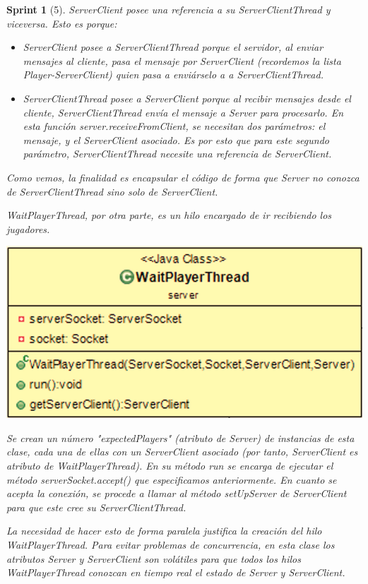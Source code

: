 \documentclass[12pt,a4paper,openright]{book}
\theoremstyle{break}
\newtheorem*{sprint}{Sprint}
\begin{document}
\begin{sprint}[5]
ServerClient posee una referencia a su ServerClientThread y viceversa. Esto es porque:

\begin{itemize}
\item ServerClient posee a ServerClientThread porque el servidor, al enviar mensajes al cliente, pasa el mensaje por ServerClient (recordemos la lista Player-ServerClient) quien pasa a enviárselo a a ServerClientThread.
\item ServerClientThread posee a ServerClient porque al recibir mensajes desde el cliente, ServerClientThread envía el mensaje a Server para procesarlo. En esta función server.receiveFromClient, se necesitan dos parámetros: el mensaje, y el ServerClient asociado. Es por esto que para este segundo parámetro, ServerClientThread necesite una referencia de ServerClient.
\end{itemize}

Como vemos, la finalidad es encapsular el código de forma que Server no conozca de ServerClientThread sino solo de ServerClient.

WaitPlayerThread, por otra parte, es un hilo encargado de ir recibiendo los jugadores.

\begin{center}
\includegraphics[scale=0.3]{WaitPlayerThread-sprint5.png} 
\end{center}

Se crean un número "expectedPlayers" (atributo de Server) de instancias de esta clase, cada una de ellas con un ServerClient asociado (por tanto, ServerClient es atributo de WaitPlayerThread). En su método run se encarga de ejecutar el método serverSocket.accept() que especificamos anteriormente. En cuanto se acepta la conexión, se procede a llamar al método setUpServer de ServerClient para que este cree su ServerClientThread.

La necesidad de hacer esto de forma paralela justifica la creación del hilo WaitPlayerThread. Para evitar problemas de concurrencia, en esta clase los atributos Server y ServerClient son volátiles para que todos los hilos WaitPlayerThread conozcan en tiempo real el estado de Server y ServerClient.


\end{sprint}
\end{document}
